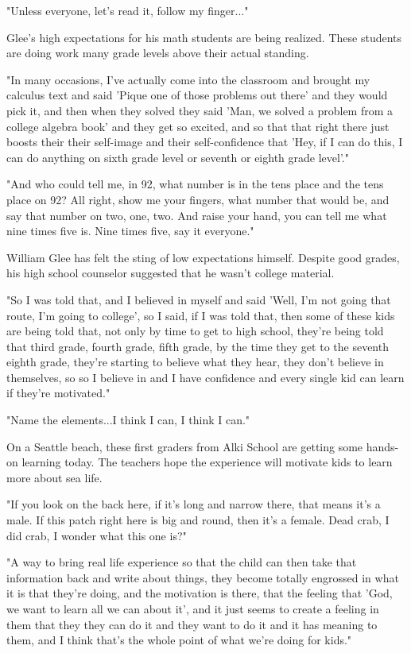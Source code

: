 "Unless everyone, let's read it, follow my finger..."

Glee's high expectations for his math students are being realized.
These students are doing work many grade levels above their actual standing.

"In many occasions, I've actually come into the classroom and brought my calculus text and said 'Pique one of those problems out there' and they would pick it, and then when they solved they said 'Man, we solved a problem from a college algebra book' and they get so excited, and so that that right there just boosts their their self-image and their self-confidence that 'Hey, if I can do this, I can do anything on sixth grade level or seventh or eighth grade level'."

"And who could tell me, in 92, what number is in the tens place and the tens place on 92?
All right, show me your fingers, what number that would be, and say that number on two, one, two.
And raise your hand, you can tell me what nine times five is.
Nine times five, say it everyone."

William Glee has felt the sting of low expectations himself.
Despite good grades, his high school counselor suggested that he wasn't college material.

"So I was told that, and I believed in myself and said 'Well, I'm not going that route, I'm going to college', so I said, if I was told that, then some of these kids are being told that, not only by time to get to high school, they're being told that third grade, fourth grade, fifth grade, by the time they get to the seventh eighth grade, they're starting to believe what they hear, they don't believe in themselves, so so I believe in and I have confidence and every single kid can learn if they're motivated."

"Name the elements...I think I can, I think I can."

On a Seattle beach, these first graders from Alki School are getting some hands-on learning today.
The teachers hope the experience will motivate kids to learn more about sea life.

"If you look on the back here, if it's long and narrow there, that means it's a male.
If this patch right here is big and round, then it's a female.
Dead crab, I did crab, I wonder what this one is?"

"A way to bring real life experience so that the child can then take that information back and write about things, they become totally engrossed in what it is that they're doing, and the motivation is there, that the feeling that 'God, we want to learn all we can about it', and it just seems to create a feeling in them that they they can do it and they want to do it and it has meaning to them, and I think that's the whole point of what we're doing for kids."

